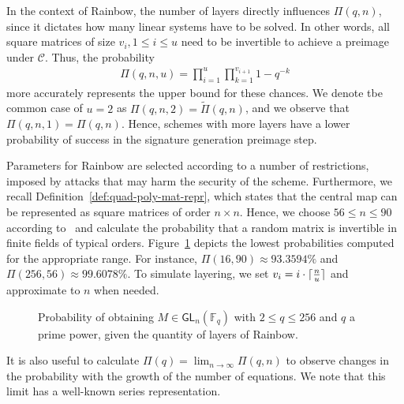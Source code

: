 \documentclass[12pt, a4paper, oneside]{memoir}
\DeclareMathOperator*{\argmin}{argmin}
\DeclarePairedDelimiter{\ceil}{\lceil}{\rceil}
\theoremstyle{definition}
\begin{document}
In the context of Rainbow, the number of layers directly influences $\Pi(q, n)$, since it dictates how many linear systems have to be solved. In other words, all square matrices of size $v_{i}, 1 \leq i \leq u$ need to be invertible to achieve a preimage under $\mathcal{C}$. Thus, the probability
\begin{align}
  \Pi(q, n, u) = \prod_{i = 1}^{u} \prod_{k = 1}^{v_{i + 1}} 1 - q^{-k}
\end{align}
more accurately represents the upper bound for these chances. We denote tbe common case of $u = 2$ as $\Pi(q, n, 2) = \widetilde{\Pi}(q, n)$, and we observe that $\Pi(q, n, 1) = \Pi(q, n)$. Hence, schemes with more layers have a lower probability of success in the signature generation preimage step.

Parameters for Rainbow are selected according to a number of restrictions, imposed by attacks that may harm the security of the scheme. Furthermore, we recall Definition~\ref{def:quad-poly-mat-repr}, which states that the central map can be represented as square matrices of order $n \times n$. Hence, we choose $56 \leq n \leq 90$ according to~\cite[Tables~6.4,~6.8,~6.13]{Petzoldt:201307} and calculate the probability that a random matrix is invertible in finite fields of typical orders. Figure~\ref{fig:prob-inv} depicts the lowest probabilities computed for the appropriate range. For instance, $\Pi(16, 90) \approx 93.3594\%$ and $\Pi(256, 56) \approx 99.6078\%$. To simulate layering, we set $v_{i} = i \cdot \ceil{\frac{n}{u}}$ and approximate to $n$ when needed.

\begin{figure}[htbp]
  \subfloat[
    $\argmin_{56 \leq n \leq 90}$ of $\Pi(q, n)$
    and $\widetilde{\Pi}(q, n)$.\label{fig:prob-inv-normal-size}
  ]{
  }
  \caption{Probability of obtaining $M \in \mathsf{GL}_{n}(\mathbb{F}_{q})$
    with $2 \leq q \leq 256$ and $q$ a prime power, given the
    quantity of layers of Rainbow.}\label{fig:prob-inv}
\end{figure}

It is also useful to calculate $\Pi(q) = \lim_{n \to \infty} \Pi(q, n)$ to observe changes in the probability with the growth of the number of equations. We note that this limit has a well-known series representation.
\end{document}
